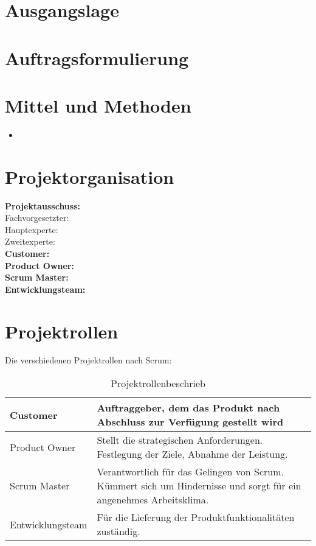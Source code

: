 \section{Ausgangslage}
 
\section{Auftragsformulierung}
  
\section{Mittel und Methoden}
\begin{itemize}
	\item 
\end{itemize}
\section{Projektorganisation}
\textbf{Projektausschuss:} \\
Fachvorgesetzter: \\
Hauptexperte:  \\
Zweitexperte:  \\
\textbf{Customer:}  \\
\textbf{Product Owner:} \\
\textbf{Scrum Master:} \\
\textbf{Entwicklungsteam:} \\
\pagebreak
\section{Projektrollen}
Die verschiedenen Projektrollen nach Scrum: \\
\begin{table}[h]
\begin{tabularx}{\textwidth}{ |X|X| }
\hline
Customer & Auftraggeber, dem das Produkt nach Abschluss zur Verfügung gestellt wird \\ \hline
Product Owner & Stellt die strategischen Anforderungen. Festlegung der Ziele, Abnahme der Leistung.\\ \hline
Scrum Master & Verantwortlich für das Gelingen von Scrum. Kümmert sich um Hindernisse und sorgt für ein angenehmes Arbeitsklima. \\ \hline
Entwicklungsteam & Für die Lieferung der Produktfunktionalitäten zuständig. \\ \hline
\end{tabularx}
\caption{Projektrollenbeschrieb}
\end{table}